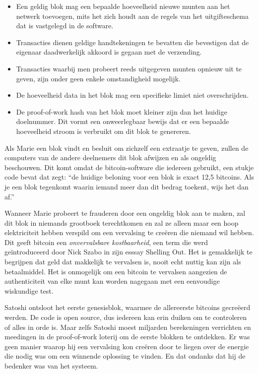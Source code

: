 \begin{itemize}
    \item Een geldig blok mag een bepaalde hoeveelheid nieuwe munten aan het netwerk toevoegen, mits het zich houdt aan de regels van het uitgifteschema dat is vastgelegd in de software.
    \item Transacties dienen geldige handtekeningen te bevatten die bevestigen dat de eigenaar daadwerkelijk akkoord is gegaan met de verzending.
    \item Transacties waarbij men probeert reeds uitgegeven munten opnieuw uit te geven, zijn onder geen enkele omstandigheid mogelijk.
    \item De hoeveelheid data in het blok mag een specifieke limiet niet overschrijden.
    \item De proof-of-work hash van het blok moet kleiner zijn dan het huidige doelnummer. Dit vormt een onweerlegbaar bewijs dat er een bepaalde hoeveelheid stroom is verbruikt om dit blok te genereren.
\end{itemize}

Als Marie een blok vindt en besluit om zichzelf een extraatje te geven, zullen de computers van de andere deelnemers dit blok afwijzen en als ongeldig beschouwen. Dit komt omdat de bitcoin-software die iedereen gebruikt, een stukje code bevat dat zegt: ``de huidige beloning voor een blok is exact 12,5 bitcoins. Als je een blok tegenkomt waarin iemand meer dan dit bedrag toekent, wijs het dan af.''

Wanneer Marie probeert te frauderen door een ongeldig blok aan te maken, zal dit blok in niemands grootboek terechtkomen en zal ze alleen maar een hoop elektriciteit hebben verspild om een vervalsing te creëren die niemand wil hebben. Dit geeft bitcoin een \textit{onvervalsbare kostbaarheid}, een term die werd geïntroduceerd door Nick Szabo in zijn esssay \textquotedbl{}Shelling Out\textquotedbl{}. Het is gemakkelijk te begrijpen dat geld dat makkelijk te vervalsen is, nooit echt nuttig kan zijn als betaalmiddel. Het is onmogelijk om een bitcoin te vervalsen aangezien de authenticiteit van elke munt kan worden nagegaan met een eenvoudige wiskundige test.

Satoshi ontsloot het eerste genesisblok, waarmee de allereerste bitcoins gecreëerd werden. De code is open source, dus iedereen kan erin duiken om te controleren of alles in orde is. Maar zelfs Satoshi moest miljarden berekeningen verrichten en meedingen in de proof-of-work loterij om de eerste blokken te ontdekken. Er was geen manier waarop hij een vervalsing kon creëren door te liegen over de energie die nodig was om een winnende oplossing te vinden. En dat ondanks dat hij de bedenker was van het systeem.

